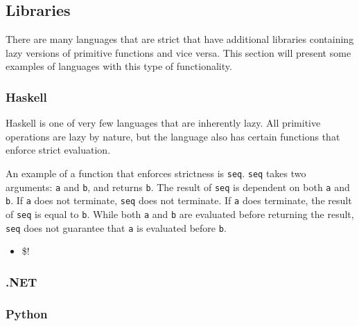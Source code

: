 \subsection{Libraries}
There are many languages that are strict that have additional libraries
containing lazy versions of primitive functions and vice versa. This section
will present some examples of languages with this type of functionality.

\subsubsection{Haskell}
Haskell is one of very few languages that are inherently lazy. All primitive
operations are lazy by nature, but the language also has certain functions that
enforce strict evaluation.

An example of a function that enforces strictness is \texttt{seq}. \texttt{seq}
takes two arguments: \texttt{a} and \texttt{b}, and returns \texttt{b}. The
result of \texttt{seq} is dependent on both \texttt{a} and \texttt{b}. If
\texttt{a} does not terminate, \texttt{seq} does not terminate. If \texttt{a}
does terminate, the result of \texttt{seq} is equal to \texttt{b}. While both
\texttt{a} and \texttt{b} are evaluated before returning the result,
\texttt{seq} does not guarantee that \texttt{a} is evaluated before \texttt{b}.

\begin{itemize}
\item \$!
\end{itemize}

\subsubsection{.NET}

\subsubsection{Python}
